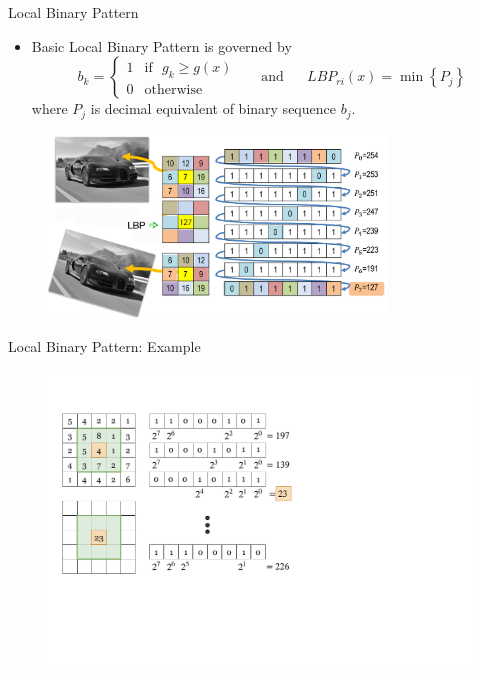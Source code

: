 \begin{frame}{Local Binary Pattern}
\vspace{-6pt}
\begin{small}
\begin{itemize}
\item Basic Local Binary Pattern is governed by
\[\boxed{{b_k} = \left\{ {\begin{array}{*{20}{c}}
  1&{\text{if~~}{g_k} \geqslant g(x)} \\ 
  0&\text{otherwise} 
\end{array}} \right.}\text{~~~~~and~~~~~}\boxed{LB{P_{ri}}(x) = \min \left\{ {{P_j}} \right\}}\]
where $P_j$ is decimal equivalent of binary sequence $b_j$.
\end{itemize}
\end{small}
\vspace{-6pt}
\begin{figure}
\centering
\includegraphics[width=0.8\textwidth]{Figures/FE010}
\end{figure}
\end{frame}

\begin{frame}{Local Binary Pattern: Example}
\begin{figure}
\centering
\includegraphics[width=.8\textwidth]{Figures/LBP001}
\end{figure}
\end{frame}

